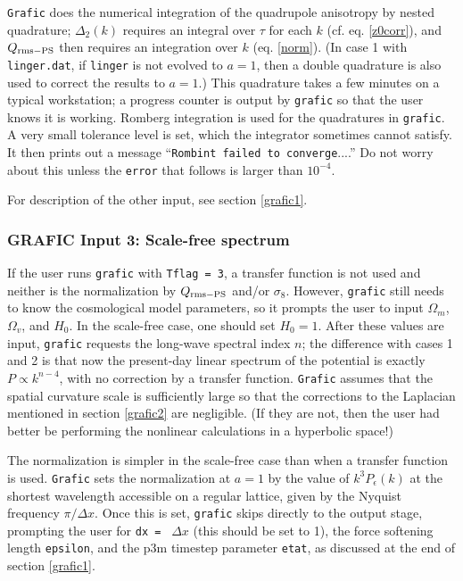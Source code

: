 {\tt Grafic} does the numerical integration of the quadrupole anisotropy
by nested quadrature; $\Delta_2(k)$ requires an integral over $\tau$
for each $k$ (cf. eq. \ref{z0corr}), and $Q_{\rm rms-PS}$ then requires
an integration over $k$ (eq. \ref{norm}).  (In case 1 with {\tt linger.dat},
if {\tt linger} is not evolved to $a=1$, then a double quadrature is also
used to correct the results to $a=1$.)  This quadrature takes a few minutes
on a typical workstation; a progress counter is output by {\tt grafic} so
that the user knows it is working.  Romberg integration is used for the
quadratures in {\tt grafic}.  A very small tolerance level is set, which
the integrator sometimes cannot satisfy.  It then prints out a message
``{\tt Rombint failed to converge}....''  Do not worry about this unless
the {\tt error} that follows is larger than $10^{-4}$.

For description of the other input, see section \ref{grafic1}.

\subsubsection{GRAFIC Input 3: Scale-free spectrum}

If the user runs {\tt grafic} with {\tt Tflag = 3}, a transfer function
is not used and neither is the normalization by $Q_{\rm rms-PS}$ and/or
$\sigma_8$.  However, {\tt grafic} still needs to know the cosmological
model parameters, so it prompts the user to input $\Omega_m$, $\Omega_v$,
and $H_0$.  In the scale-free case, one should set $H_0=1$.  After
these values are input, {\tt grafic} requests the long-wave spectral
index $n$; the difference with cases 1 and 2 is that now the present-day
linear spectrum of the potential is exactly $P\propto k^{n-4}$, with no
correction by a transfer function.  {\tt Grafic} assumes that the spatial
curvature scale is sufficiently large so that the corrections to the Laplacian
mentioned in section \ref{grafic2} are negligible.  (If they are not, then
the user had better be performing the nonlinear calculations in a hyperbolic
space!)

The normalization is simpler in the scale-free case than when a transfer
function is used.  {\tt Grafic} sets the normalization at $a=1$ by the
value of $k^3P_\epsilon(k)$ at the shortest wavelength accessible on a
regular lattice, given by the Nyquist frequency $\pi/\Delta x$.   Once
this is set, {\tt grafic} skips directly to the output stage, prompting
the user for {\tt dx = } $\Delta x$ (this should be set to 1), the
force softening length {\tt epsilon}, and the p3m timestep parameter
{\tt etat}, as discussed at the end of section \ref{grafic1}.

